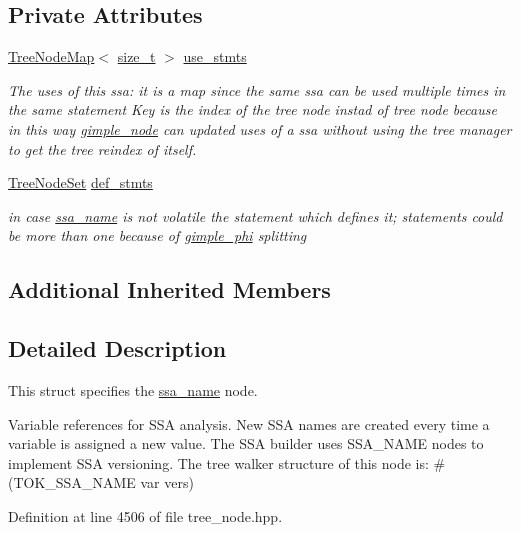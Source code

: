 \subsection*{Private Attributes}
\begin{DoxyCompactItemize}
\item 
\hyperlink{classTreeNodeMap}{Tree\+Node\+Map}$<$ \hyperlink{tutorial__fpt__2017_2intro_2sixth_2test_8c_a7c94ea6f8948649f8d181ae55911eeaf}{size\+\_\+t} $>$ \hyperlink{structssa__name_a9af8fc723020e14134ef168fd7bfa0f8}{use\+\_\+stmts}
\begin{DoxyCompactList}\small\item\em The uses of this ssa\+: it is a map since the same ssa can be used multiple times in the same statement Key is the index of the tree node instad of tree node because in this way \hyperlink{structgimple__node}{gimple\+\_\+node} can updated uses of a ssa without using the tree manager to get the tree reindex of itself. \end{DoxyCompactList}\item 
\hyperlink{classTreeNodeSet}{Tree\+Node\+Set} \hyperlink{structssa__name_a21e52d768d609913c6b0db67d9882445}{def\+\_\+stmts}
\begin{DoxyCompactList}\small\item\em in case \hyperlink{structssa__name}{ssa\+\_\+name} is not volatile the statement which defines it; statements could be more than one because of \hyperlink{structgimple__phi}{gimple\+\_\+phi} splitting \end{DoxyCompactList}\end{DoxyCompactItemize}
\subsection*{Additional Inherited Members}


\subsection{Detailed Description}
This struct specifies the \hyperlink{structssa__name}{ssa\+\_\+name} node. 

Variable references for S\+SA analysis. New S\+SA names are created every time a variable is assigned a new value. The S\+SA builder uses S\+S\+A\+\_\+\+N\+A\+ME nodes to implement S\+SA versioning. The tree walker structure of this node is\+: \#(T\+O\+K\+\_\+\+S\+S\+A\+\_\+\+N\+A\+ME var vers) 

Definition at line 4506 of file tree\+\_\+node.\+hpp.



